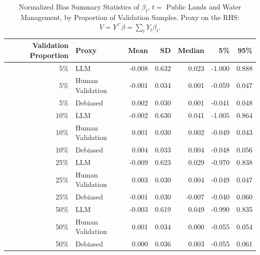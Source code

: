 \begin{table}

\caption{\label{tab:unnamed-chunk-1}Normalized Bias Summary Statistics of $\beta_{t}$, $t=$ Public Lands and Water Management, by Proportion of Validation Samples.
      Proxy on the RHS: $V = Y^\top \beta = \sum_{t} Y_t \beta_t$.}
\centering
\begin{tabular}[t]{rlrrrrr}
\toprule
Validation Proportion & Proxy & Mean & SD & Median & 5\% & 95\%\\
\midrule
5\% & LLM & -0.008 & 0.632 & 0.023 & -1.000 & 0.888\\
5\% & Human Validation & -0.001 & 0.034 & 0.001 & -0.059 & 0.047\\
5\% & Debiased & 0.002 & 0.030 & 0.001 & -0.041 & 0.048\\
10\% & LLM & -0.002 & 0.630 & 0.041 & -1.005 & 0.864\\
10\% & Human Validation & 0.001 & 0.030 & 0.002 & -0.049 & 0.043\\
10\% & Debiased & 0.004 & 0.033 & 0.004 & -0.048 & 0.056\\
25\% & LLM & -0.009 & 0.623 & 0.029 & -0.970 & 0.838\\
25\% & Human Validation & 0.003 & 0.030 & 0.004 & -0.049 & 0.047\\
25\% & Debiased & -0.001 & 0.030 & -0.007 & -0.040 & 0.060\\
50\% & LLM & -0.003 & 0.619 & 0.049 & -0.990 & 0.835\\
50\% & Human Validation & 0.001 & 0.034 & 0.000 & -0.055 & 0.054\\
50\% & Debiased & 0.000 & 0.036 & 0.003 & -0.055 & 0.061\\
\bottomrule
\end{tabular}
\end{table}
